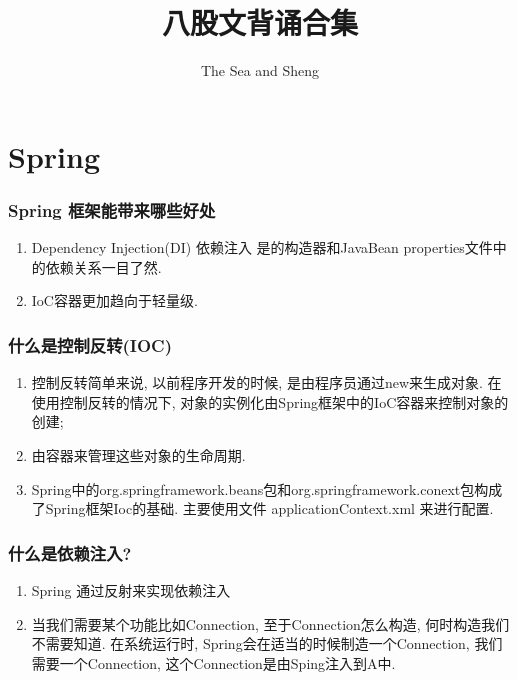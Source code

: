 \documentclass[UTF8]{ctexart}
\begin{document}
	
	\title{八股文背诵合集}
	\author{The Sea and Sheng}
	\maketitle
	
	\tableofcontents
	\newpage
	
	\section{Spring}
	\subsubsection{Spring 框架能带来哪些好处}

	\begin{enumerate}
		\item Dependency Injection(DI) 依赖注入 是的构造器和JavaBean properties文件中的依赖关系一目了然.
		\item IoC容器更加趋向于轻量级.
	\end{enumerate}
	
	\subsubsection{什么是控制反转(IOC)}
	\begin{enumerate}
		\item 
		控制反转简单来说, 以前程序开发的时候, 是由程序员通过new来生成对象. 在使用控制反转的情况下, 对象的实例化由Spring框架中的IoC容器来控制对象的创建; 
		\item 由容器来管理这些对象的生命周期.
		\item Spring中的org.springframework.beans包和org.springframework.conext包构成了Spring框架Ioc的基础. 主要使用文件 applicationContext.xml 来进行配置.
	\end{enumerate}

	\subsubsection{什么是依赖注入?}
	\begin{enumerate}
		\item Spring 通过反射来实现依赖注入
		\item 当我们需要某个功能比如Connection, 至于Connection怎么构造, 何时构造我们不需要知道. 在系统运行时, Spring会在适当的时候制造一个Connection, 我们需要一个Connection, 这个Connection是由Sping注入到A中. 
	\end{enumerate}
\end{document}
